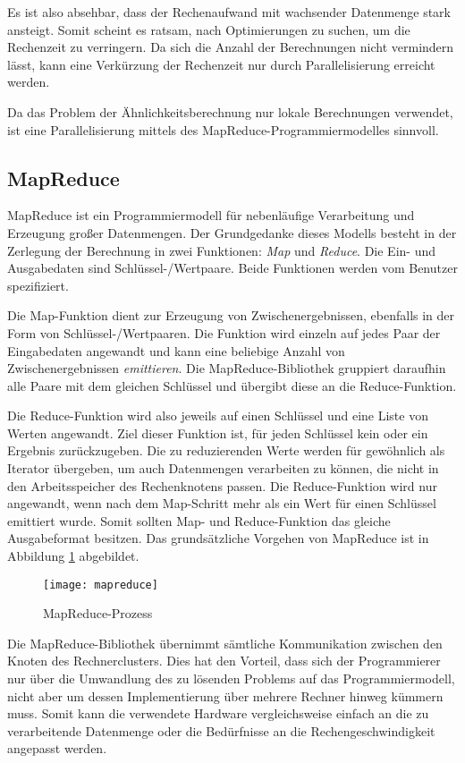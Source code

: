 Es ist also absehbar, dass der Rechenaufwand mit wachsender Datenmenge stark ansteigt. Somit scheint es ratsam, nach Optimierungen zu suchen, um die Rechenzeit zu verringern. Da sich die Anzahl der Berechnungen nicht vermindern lässt, kann eine Verkürzung der Rechenzeit nur durch Parallelisierung erreicht werden.

Da das Problem der Ähnlichkeitsberechnung nur lokale Berechnungen verwendet, ist eine Parallelisierung mittels des MapReduce-Programmiermodelles sinnvoll.

\subsection{MapReduce}
\label{mapreduce}

MapReduce \cite{dg2004} ist ein Programmiermodell für nebenläufige Verarbeitung und Erzeugung großer Datenmengen. Der Grundgedanke dieses Modells besteht in der Zerlegung der Berechnung in zwei Funktionen: \emph{Map} und \emph{Reduce}. Die Ein- und Ausgabedaten sind Schlüssel-/Wertpaare. Beide Funktionen werden vom Benutzer spezifiziert.

Die Map-Funktion dient zur Erzeugung von Zwischenergebnissen, ebenfalls in der Form von Schlüssel-/Wertpaaren. Die Funktion wird einzeln auf jedes Paar der Eingabedaten angewandt und kann eine beliebige Anzahl von Zwischenergebnissen \emph{emittieren}. Die MapReduce-Bibliothek gruppiert daraufhin alle Paare mit dem gleichen Schlüssel und übergibt diese an die Reduce-Funktion.

Die Reduce-Funktion wird also jeweils auf einen Schlüssel und eine Liste von Werten angewandt. Ziel dieser Funktion ist, für jeden Schlüssel kein oder ein Ergebnis zurückzugeben. Die zu reduzierenden Werte werden für gewöhnlich als Iterator übergeben, um auch Datenmengen verarbeiten zu können, die nicht in den Arbeitsspeicher des Rechenknotens passen. Die Reduce-Funktion wird nur angewandt, wenn nach dem Map-Schritt mehr als ein Wert für einen Schlüssel emittiert wurde. Somit sollten Map- und Reduce-Funktion das gleiche Ausgabeformat besitzen. Das grundsätzliche Vorgehen von MapReduce ist in Abbildung \ref{fig:mapreduce} abgebildet.

\begin{figure}
\centering
\texttt{[image: mapreduce]}
\caption{MapReduce-Prozess}
\label{fig:mapreduce}
\end{figure}

Die MapReduce-Bibliothek übernimmt sämtliche Kommunikation zwischen den Knoten des Rechnerclusters. Dies hat den Vorteil, dass sich der Programmierer nur über die Umwandlung des zu lösenden Problems auf das Programmiermodell, nicht aber um dessen Implementierung über mehrere Rechner hinweg kümmern muss. Somit kann die verwendete Hardware vergleichsweise einfach an die zu verarbeitende Datenmenge oder die Bedürfnisse an die Rechengeschwindigkeit angepasst werden.

